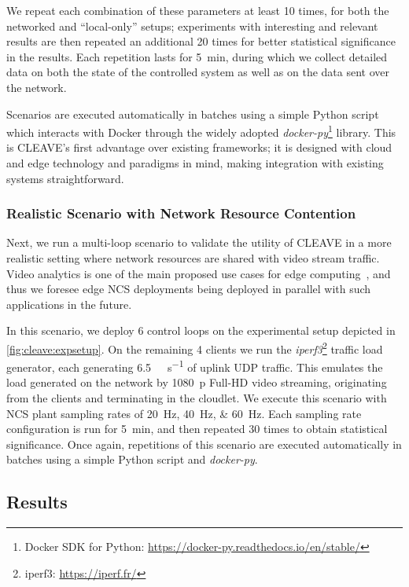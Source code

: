 We repeat each combination of these parameters at least \num{10} times, for both the networked and ``local-only'' setups; experiments with interesting and relevant results are then repeated an additional \num{20} times for better statistical significance in the results.
Each repetition lasts for \SI{5}{\minute}, during which we collect detailed data on both the state of the controlled system as well as on the data sent over the network.

Scenarios are executed automatically in batches using a simple Python script which interacts with Docker through the widely adopted \emph{docker-py}\footnote{Docker SDK for Python: \url{https://docker-py.readthedocs.io/en/stable/}} library.
This is \ac{CLEAVE}'s first advantage over existing frameworks; it is designed with cloud and edge technology and paradigms in mind, making integration with existing systems straightforward.

\subsubsection{Realistic Scenario with Network Resource Contention}

Next, we run a multi-loop scenario to validate the utility of \ac{CLEAVE} in a more realistic setting where network resources are shared with video stream traffic.
Video analytics is one of the main proposed use cases for edge computing~\cite{Ananthanarayanan2017Analytics,Yi2017Analytics,Wang2018Analytics}, and thus we foresee edge \ac{NCS} deployments being deployed in parallel with such applications in the future.

In this scenario, we deploy \num{6} control loops on the experimental setup depicted in \cref{fig:cleave:expsetup}.
On the remaining \num{4} clients we run the \emph{iperf3}\footnote{iperf3: \url{https://iperf.fr/}} traffic load generator, each generating \SI[per-mode=symbol]{6.5}{\mega\bit\per\second} of uplink \ac{UDP} traffic.
This emulates the load generated on the network by \SI{1080}{p} Full-HD video streaming, originating from the clients and terminating in the cloudlet.
We execute this scenario with \ac{NCS} plant sampling rates of \SIlist{20;40;60}{\hertz}.
Each sampling rate configuration is run for \SI{5}{\minute}, and then repeated \num{30} times to obtain statistical significance.
Once again, repetitions of this scenario are executed automatically in batches using a simple Python script and \emph{docker-py}.

\subsection{Results}\label{ssec:results}

